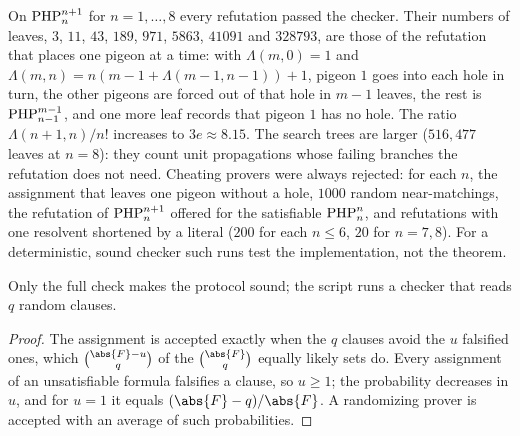 \begin{refsection}
On $\mathrm{PHP}^{n+1}_{n}$ for $n=1,\dots,8$ every refutation passed the checker. Their numbers of leaves, $3$, $11$, $43$, $189$, $971$, $5863$, $41091$ and $328793$, are those of the refutation that places one pigeon at a time: with $\Lambda(m,0)=1$ and $\Lambda(m,n)=n(m-1+\Lambda(m-1,n-1))+1$, pigeon $1$ goes into each hole in turn, the other pigeons are forced out of that hole in $m-1$ leaves, the rest is $\mathrm{PHP}^{m-1}_{n-1}$, and one more leaf records that pigeon $1$ has no hole. The ratio $\Lambda(n+1,n)/n!$ increases to $3e\approx8.15$. The search trees are larger ($516{,}477$ leaves at $n=8$): they count unit propagations whose failing branches the refutation does not need. Cheating provers were always rejected: for each $n$, the assignment that leaves one pigeon without a hole, $1000$ random near-matchings, the refutation of $\mathrm{PHP}^{n+1}_{n}$ offered for the satisfiable $\mathrm{PHP}^{n}_{n}$, and refutations with one resolvent shortened by a literal ($200$ for each $n\le6$, $20$ for $n=7,8$). For a deterministic, sound checker such runs test the implementation, not the theorem.

Only the full check makes the protocol sound; the script  runs a checker that reads $q$ random clauses.


\begin{proof}
The assignment is accepted exactly when the $q$ clauses avoid the $u$ falsified ones, which $\binom{\abs{F}-u}{q}$ of the $\binom{\abs{F}}{q}$ equally likely sets do. Every assignment of an unsatisfiable formula falsifies a clause, so $u\ge1$; the probability decreases in $u$, and for $u=1$ it equals $(\abs{F}-q)/\abs{F}$. A randomizing prover is accepted with an average of such probabilities.
\end{proof}


\end{refsection}
